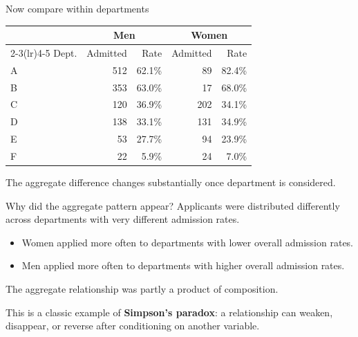\documentclass[11pt,aspectratio=169]{beamer}
\begin{document}
\begin{frame}{Now compare within departments}
\begin{center}
\scriptsize
\renewcommand{\arraystretch}{1.16}
\begin{tabular}{lrrrr}
\toprule
 & \multicolumn{2}{c}{Men} & \multicolumn{2}{c}{Women} \\
\cmidrule(lr){2-3}\cmidrule(lr){4-5}
Dept. & Admitted & Rate & Admitted & Rate \\
\midrule
A & 512 & 62.1\% & 89 & 82.4\% \\
B & 353 & 63.0\% & 17 & 68.0\% \\
C & 120 & 36.9\% & 202 & 34.1\% \\
D & 138 & 33.1\% & 131 & 34.9\% \\
E & 53 & 27.7\% & 94 & 23.9\% \\
F & 22 & 5.9\% & 24 & 7.0\% \\
\bottomrule
\end{tabular}
\end{center}

\vspace{0.4em}
The aggregate difference changes substantially once department is considered.
\end{frame}

\begin{frame}{Why did the aggregate pattern appear?}
Applicants were distributed differently across departments with very different admission rates.

\vspace{0.6em}
\begin{itemize}
  \item Women applied more often to departments with lower overall admission rates.
  \item Men applied more often to departments with higher overall admission rates.
\end{itemize}

\vspace{0.7em}
\begin{center}
\alert{The aggregate relationship was partly a product of composition.}
\end{center}

\vspace{0.6em}
This is a classic example of \textbf{Simpson's paradox}: a relationship can weaken, disappear, or reverse after conditioning on another variable.
\end{frame}
\end{document}
